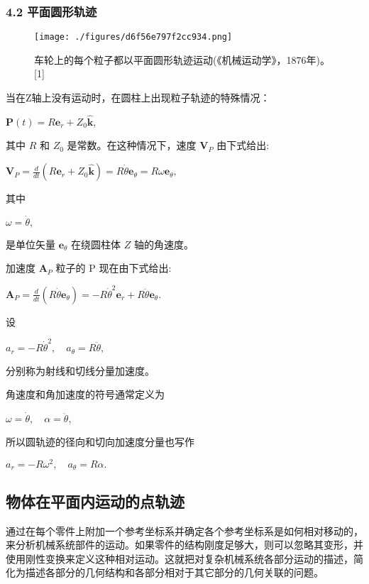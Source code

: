 \subsubsection{4.2 平面圆形轨迹}

\begin{figure}[ht]
\centering
\texttt{[image: ./figures/d6f56e797f2cc934.png]}
\caption{车轮上的每个粒子都以平面圆形轨迹运动(《机械运动学》，1876年)。[1]} \label{fig_YDX_10}
\end{figure}

当在Z轴上没有运动时，在圆柱上出现粒子轨迹的特殊情况：

$\mathbf{P}(t) = R \mathbf{e}_r + Z_0 \mathbf{\hat{k}}$,

其中 $R$ 和 $Z_0$ 是常数。在这种情况下，速度 $\mathbf{V}_P$ 由下式给出:

$\mathbf{V}_P = \frac{d}{dt}(R \mathbf{e}_r + Z_0 \mathbf{\hat{k}}) = R \dot{\theta} \mathbf{e}_{\theta} = R \omega \mathbf{e}_{\theta},$

其中

$\omega = \dot{\theta},$

是单位矢量 $\mathbf{e}_{\theta}$ 在绕圆柱体 $Z$ 轴的角速度。

加速度 $\mathbf{A}_P$ 粒子的 P 现在由下式给出:

$\mathbf{A}_P = \frac{d}{dt}(R \dot{\theta} \mathbf{e}_{\theta}) = -R \dot{\theta}^2 \mathbf{e}_r + R \ddot{\theta} \mathbf{e}_{\theta}.$

设

$a_r = -R \dot{\theta}^2, \quad a_{\theta} = R \ddot{\theta},$

分别称为射线和切线分量加速度。

角速度和角加速度的符号通常定义为

$\omega = \dot{\theta}, \quad \alpha = \ddot{\theta}$,

所以圆轨迹的径向和切向加速度分量也写作

$a_r = -R \omega^2, \quad a_{\theta} = R \alpha.$

\subsection{物体在平面内运动的点轨迹}

通过在每个零件上附加一个参考坐标系并确定各个参考坐标系是如何相对移动的，来分析机械系统部件的运动。如果零件的结构刚度足够大，则可以忽略其变形，并使用刚性变换来定义这种相对运动。这就把对复杂机械系统各部分运动的描述，简化为描述各部分的几何结构和各部分相对于其它部分的几何关联的问题。

